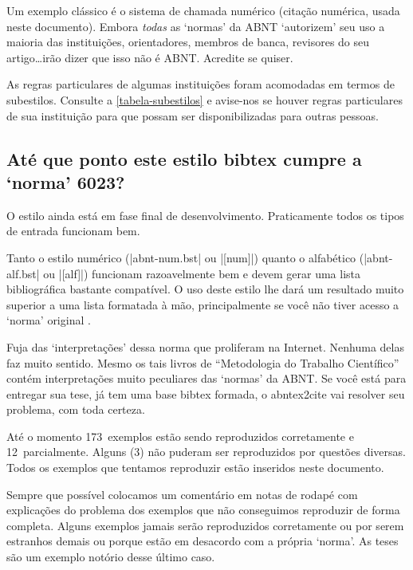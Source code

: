 \documentclass[a4paper]{ltxdoc}
\newcommand{\OKs}{173}
\newcommand{\quaseOKs}{12}
\newcommand{\nadaOK}{3}
\begin{document}
Um exemplo clássico é o sistema de chamada numérico (citação numérica, usada
neste documento). Embora \emph{todas} as `normas' da
ABNT\cite{NBR6023:2000,NBR6023:2002,NBR10520:1988,NBR10520:2001} `autorizem' seu
uso a maioria das instituições, orientadores, membros de banca, revisores do seu
artigo\ldots irão dizer que isso não é ABNT. Acredite se quiser.

As regras particulares de algumas instituições foram acomodadas em termos de
subestilos. Consulte a \autoref{tabela-subestilos} e avise-nos se houver
regras particulares de sua instituição para que possam ser disponibilizadas
para outras pessoas.

\subsection{Até que ponto este estilo \textsf{bibtex} cumpre a `norma' 6023?}

O estilo ainda está em fase final de desenvolvimento. Praticamente
todos os tipos de entrada funcionam bem.

Tanto o estilo numérico (|abnt-num.bst| ou |[num]|) quanto o alfabético
(|abnt-alf.bst| ou |[alf]|) funcionam razoavelmente bem e devem
gerar uma lista bibliográfica bastante compatível. O uso deste estilo lhe dará
um resultado muito superior a uma lista formatada à mão, principalmente se você
não tiver acesso a `norma' original \cite{NBR6023:2000}.

Fuja das `interpretações' dessa norma que proliferam na Internet. Nenhuma delas
faz muito sentido. Mesmo os tais livros de ``Metodologia do Trabalho
Científico'' contém interpretações muito peculiares das `normas' da ABNT.
Se você está para entregar sua tese, já tem uma base \textsf{bibtex} formada,
o \textsf{abntex2cite} vai resolver seu problema, com toda certeza.

Até o momento \OKs\ exemplos estão sendo reproduzidos corretamente e \quaseOKs\
parcialmente. Alguns (\nadaOK) não puderam ser reproduzidos por questões
diversas. Todos os exemplos que tentamos reproduzir estão inseridos neste
documento.

Sempre que possível colocamos um comentário em notas de rodapé com explicações
do problema dos exemplos que não conseguimos reproduzir de forma completa.
Alguns exemplos jamais serão reproduzidos corretamente ou por serem estranhos
demais ou porque estão em desacordo com a própria `norma'. As teses são um
exemplo notório desse último caso.
\end{document}
